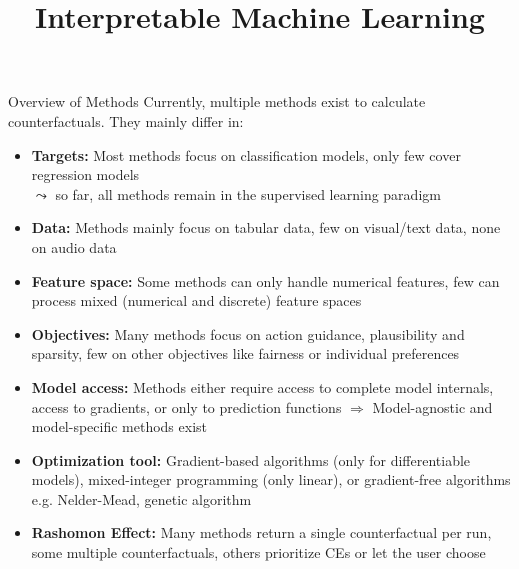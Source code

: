 \documentclass[10pt,compress,t,notes=noshow, xcolor=table]{beamer}
\title{Interpretable Machine Learning}
\date{}
\begin{document}
	
	
	
	
	
	

	


\begin{frame}{Overview of Methods}
	Currently, multiple methods exist to calculate counterfactuals. They mainly differ in: 
	\begin{itemize}[<+->]
		\item \textbf{Targets:} Most methods focus on classification models, only few cover regression models\\
		$\leadsto$ so far, all methods remain in the supervised learning paradigm
		\item \textbf{Data:} Methods mainly focus on tabular data, few on visual/text data, none on audio data
		\item \textbf{Feature space:} Some methods can only handle numerical features, few can process mixed (numerical and discrete) feature spaces
		\item \textbf{Objectives:} Many methods focus on action guidance, plausibility and sparsity, few on other objectives like fairness or individual preferences
		\item \textbf{Model access:} Methods either require access to complete model internals, access to gradients, or only to prediction functions $\Rightarrow$ Model-agnostic and model-specific methods exist
		\item \textbf{Optimization tool:} Gradient-based algorithms (only for differentiable models), mixed-integer programming (only linear), or gradient-free algorithms e.g. Nelder-Mead, genetic algorithm
		\item \textbf{Rashomon Effect:} Many methods return a single counterfactual per run, some multiple counterfactuals, others prioritize CEs or let the user choose
	\end{itemize}
\end{frame}
\end{document}

